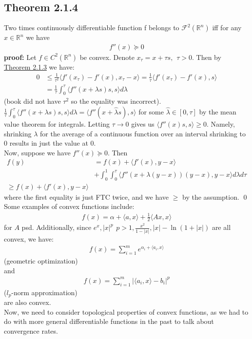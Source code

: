 \documentclass[12pt,a4paper]{article}
\begin{document}
	\subsection*{Theorem 2.1.4}\label{thm214}
	Two times continuously differentiable function f belongs to $\mathcal{F}^2(\mathbb{R}^n)$ iff for any $x \in \mathbb{R}^n$ we have
	\begin{align*}
		f''(x) \succeq 0
	\end{align*}
	\textbf{proof:} Let $f \in C^2(\mathbb{R}^n)$ be convex. Denote $x_\tau = x + \tau s, \hspace{5pt} \tau > 0$. Then by \hyperref[thm213]{Theorem 2.1.3} we have:
	\begin{align*}
		 0 &\leq \frac{1}{\tau^2} \langle f'(x_\tau) - f'(x), x_\tau - x \rangle = \frac{1}{\tau}\langle f'(x_\tau) - f'(x), s \rangle \\
		 &= \frac{1}{\tau} \int_{0}^{\tau} \langle f''(x + \lambda s)s, s \rangle d \lambda
	\end{align*}
	(book did not have $\tau^2$ so the equality was incorrect). $ \frac{1}{\tau} \int_{0}^{\tau} \langle f''(x + \lambda s)s, s \rangle d \lambda = \langle f''(x + \hat{\lambda}s), s \rangle$ for some $\hat{\lambda} \in [0, \tau]$ by the mean value theorem for integrals. Letting $\tau \rightarrow 0$ gives us $\langle f''(x)s, s \rangle \geq 0$. Namely, shrinking $\lambda$ for the average of a continuous function over an interval shrinking to $0$ results in just the value at $0$. \\
	Now, suppose we have $f''(x) \succeq 0$. Then
	\begin{align*}
		f(y) &= f(x) + \langle f'(x), y - x \rangle \\
		&+ \int_{0}^{1} \int_{0}^{\tau} \langle f''(x + \lambda(y - x))(y - x), y - x \rangle d \lambda d \tau \\
		\geq f(x) + \langle f'(x), y - x \rangle		
	\end{align*}
	where the first equality is just FTC twice, and we have $\geq$ by the assumption. \qed \\
	Some examples of convex functions include:
	\begin{align*}
		f(x) = \alpha + \langle a, x \rangle + \frac{1}{2}\langle Ax, x \rangle
	\end{align*}
	for $A$ psd. Additionally, since $e^x, |x|^p \hspace{5pt} p > 1, \frac{x^2}{1 - |x|}, |x| - \ln (1 + |x|)$ are all convex, we have:
	\begin{align*}
		f(x) = \sum_{i=1}^{m}e^{\alpha_i + \langle a_i, x \rangle}
	\end{align*}
	(geometric optimization)\\
	and 
	\begin{align*}
		f(x) = \sum_{i=1}^{m} |\langle a_i, x \rangle - b_i |^p
	\end{align*}
	($l_p$-norm approximation)\\
	are also convex. \\
	Now, we need to consider topological properties of convex functions, as we had to do with more general differentiable functions in the past to talk about convergence rates. 
\end{document}
